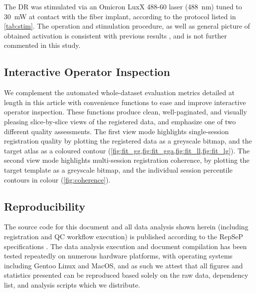 The DR was stimulated via an Omicron LuxX 488-60 laser (\SI{488}{\nano\meter}) tuned to \SI{30}{\milli\watt} at contact with the fiber implant, according to the protocol listed in \cref{tab:stim}.
The operation and stimulation procedure, as well as general picture of obtained activation is consistent with previous results \cite{Grandjean2019}, and is not further commented in this study.

\subsection{Interactive Operator Inspection}

We complement the automated whole-dataset evaluation metrics detailed at length in this article with convenience functions to ease and improve interactive operator inspection.
These functions produce clean, well-paginated, and visually pleasing slice-by-slice views of the registered data, and emphasize one of two different quality assessments.
The first view mode highlights single-session registration quality by plotting the registered data as a greyscale bitmap, and the target atlas as a coloured contour (\cref{fig:fit_gg,fig:fit_gga,fig:fit_ll,fig:fit_lg}).
The second view mode highlights multi-session registration coherence, by plotting the target template as a greyscale bitmap, and the individual session percentile contours in colour (\cref{fig:coherence}).

\subsection{Reproducibility}

The source code for this document and all data analysis shown herein (including registration and QC workflow execution) is published according to the RepSeP specifications \cite{repsep}.
The data analysis execution and document compilation has been tested repeatedly on numerous hardware platforms, with operating systems including Gentoo Linux and MacOS, and as such we attest that all figures and statistics presented can be reproduced based solely on the raw data, dependency list, and analysis scripts which we distribute.
